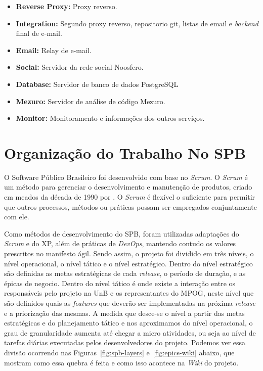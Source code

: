 \begin{itemize}
    \item \textbf{Reverse Proxy:} Proxy reverso.
    \item \textbf{Integration:} Segundo proxy reverso, repositorio git, listas de email e \textit{backend} final de e-mail.
    \item \textbf{Email:} Relay de e-mail.
    \item \textbf{Social:} Servidor da rede social Noosfero.
    \item \textbf{Database:} Servidor de banco de dados PostgreSQL
    \item \textbf{Mezuro:} Servidor de análise de código Mezuro.
    \item \textbf{Monitor:} Monitoramento e informações dos outros serviços.
\end{itemize}

\section{Organização do Trabalho No SPB}
\label{est:sof}

O Software Público Brasileiro foi desenvolvido com base no \textit{Scrum}. O \textit{Scrum} é um método para gerenciar o desenvolvimento e manutenção de produtos, criado em meados da década de 1990 por \cite{scrum}. O \textit{Scrum} é flexível o suficiente para permitir que outros processos, métodos ou práticas possam ser empregados conjuntamente com ele.

Como métodos de desenvolvimento do SPB, foram utilizadas adaptações do \textit{Scrum} e do XP, além de práticas de \textit{DevOps}, mantendo contudo os valores prescritos no manifesto ágil. Sendo assim, o projeto foi dividido em três níveis, o nível operacional, o nível tático e o  nível estratégico. Dentro do nível estratégico são definidas as metas estratégicas de cada \textit{release}, o período de duração, e as épicas de negocio. Dentro do nível tático é onde existe a interação entre os responsáveis pelo projeto na UnB e os representantes do MPOG, neste nível que são definidos quais as \textit{features} que deverão ser implementadas na próxima \textit{release} e a priorização das mesmas. A medida que desce-se o nível a partir das metas estratégicas e do planejamento tático e nos aproximamos do nível operacional, o grau de granularidade aumenta até chegar a micro atividades, ou seja ao nível de tarefas diárias executadas pelos desenvolvedores do projeto. Podemos ver essa divisão ocorrendo nas Figuras~\ref{fig:spb-layers} e~\ref{fig:epics-wiki} abaixo, que mostram como essa quebra é feita e como isso acontece na \textit{Wiki} do projeto.

